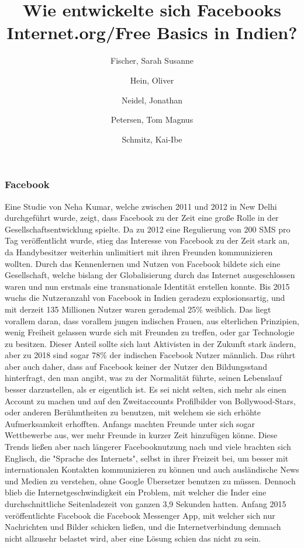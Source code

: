 \documentclass{article}
\title{Wie entwickelte sich Facebooks Internet.org/Free Basics in Indien?}
\author{
  Fischer, Sarah Susanne\\
  \and
  Hein, Oliver\\
  \and
  Neidel, Jonathan\\
  \and
  Petersen, Tom Magnus\\
  \and
  Schmitz, Kai-Ibe\\
}
\begin{document}
\maketitle
\subsubsection {Facebook}
Eine Studie von Neha Kumar, welche zwischen 2011 und 2012 in New Delhi durchgeführt wurde, zeigt, dass Facebook zu der Zeit eine große Rolle in der Gesellschaftsentwicklung spielte. 
\medskip
Da zu 2012 eine Regulierung von 200 SMS pro Tag veröffentlicht wurde, stieg das Interesse von Facebook zu der Zeit stark an,
da Handybesitzer weiterhin unlimitiert mit ihren Freunden kommunizieren wollten.
Durch das Kennenlernen und Nutzen von Facebook bildete sich eine Gesellschaft, welche bislang der Globalisierung
durch das Internet ausgeschlossen waren und nun erstmals eine transnationale Identität erstellen konnte.
Bis 2015 wuchs die Nutzeranzahl von Facebook in Indien geradezu explosionsartig, und mit derzeit 135 Millionen Nutzer waren gerademal 25\% weiblich. Das liegt vorallem daran, dass vorallem jungen indischen Frauen, aus elterlichen Prinzipien, 
wenig Freiheit gelassen wurde sich mit Freunden zu treffen, oder gar Technologie
zu besitzen. Dieser Anteil sollte sich laut Aktivisten in der Zukunft stark ändern, 
aber zu 2018 sind sogar 78\% der indischen Facebook Nutzer männlich. 
Das rührt aber auch daher, dass auf Facebook keiner der Nutzer den Bildungsstand hinterfragt, den man angibt, was zu der Normalität führte, seinen Lebenslauf besser darzustellen, als er eigentlich ist. Es sei nicht selten, sich mehr als einen Account zu machen und auf den Zweitaccounts Profilbilder von Bollywood-Stars, oder anderen Berühmtheiten zu benutzen,
mit welchem sie sich erhöhte Aufmerksamkeit erhofften. 
Anfangs machten Freunde unter sich sogar Wettbewerbe aus, wer mehr Freunde in kurzer Zeit hinzufügen könne.
Diese Trends ließen aber nach längerer Facebooknutzung nach und viele brachten sich Englisch, die "Sprache des Internets", 
selbst in ihrer Freizeit bei, um besser mit internationalen Kontakten
kommunizieren zu können und auch ausländische News und Medien zu verstehen, ohne Google Übersetzer benutzen zu müssen.
\medskip
Dennoch blieb die Internetgeschwindigkeit ein Problem, mit welcher die Inder eine durchschnittliche Seitenladezeit von ganzen 3,9 Sekunden hatten. Anfang 2015 veröffentlichte Facebook die Facebook Messenger App, mit welcher sich nur Nachrichten und Bilder schicken ließen, und die Internetverbindung demnach nicht allzusehr belastet wird, aber eine Lösung schien das nicht zu sein.
\medskip



\end{document}
